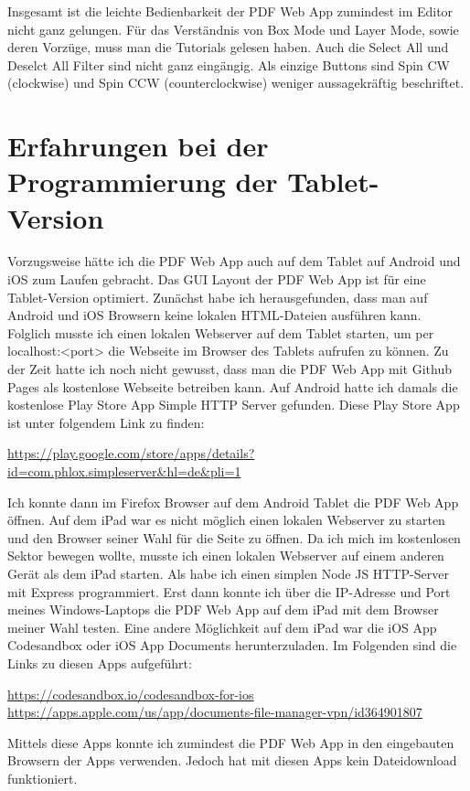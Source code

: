 Insgesamt ist die leichte Bedienbarkeit der PDF Web App zumindest im Editor nicht ganz gelungen. Für das Verständnis von Box Mode und Layer Mode, sowie deren Vorzüge, muss man die Tutorials gelesen haben. Auch die Select All und Deselct All Filter sind nicht ganz eingängig. Als einzige Buttons sind Spin CW (clockwise) und Spin CCW (counterclockwise) weniger aussagekräftig beschriftet.

\section{Erfahrungen bei der Programmierung der Tablet-Version}
Vorzugsweise hätte ich die PDF Web App auch auf dem Tablet auf Android und iOS zum Laufen gebracht. Das GUI Layout der PDF Web App ist für eine Tablet-Version optimiert. Zunächst habe ich herausgefunden, dass man auf Android und iOS Browsern keine lokalen HTML-Dateien ausführen kann. Folglich musste ich einen lokalen Webserver auf dem Tablet starten, um per localhost:<port> die Webseite im Browser des Tablets aufrufen zu können. Zu der Zeit hatte ich noch nicht gewusst, dass man die PDF Web App mit Github Pages als kostenlose Webseite betreiben kann. Auf Android hatte ich damals die kostenlose Play Store App Simple HTTP Server gefunden. Diese Play Store App ist unter folgendem Link zu finden:

\url{https://play.google.com/store/apps/details?id=com.phlox.simpleserver&hl=de&pli=1}

Ich konnte dann im Firefox Browser auf dem Android Tablet die PDF Web App öffnen. Auf dem iPad war es nicht möglich einen lokalen Webserver zu starten und den Browser seiner Wahl für die Seite zu öffnen. Da ich mich im kostenlosen Sektor bewegen wollte, musste ich einen lokalen Webserver auf einem anderen Gerät als dem iPad starten. Als habe ich einen simplen Node JS HTTP-Server mit Express programmiert. Erst dann konnte ich über die IP-Adresse und Port meines Windows-Laptops die PDF Web App auf dem iPad mit dem Browser meiner Wahl testen. Eine andere Möglichkeit auf dem iPad war die iOS App Codesandbox oder iOS App Documents herunterzuladen. Im Folgenden sind die Links zu diesen Apps aufgeführt:

\url{https://codesandbox.io/codesandbox-for-ios} \\
\url{https://apps.apple.com/us/app/documents-file-manager-vpn/id364901807}

Mittels diese Apps konnte ich zumindest die PDF Web App in den eingebauten Browsern der Apps verwenden. Jedoch hat mit diesen Apps kein Dateidownload funktioniert. \\

